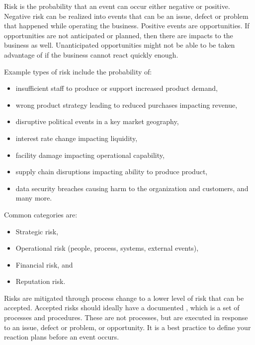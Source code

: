 %
%

Risk is the probability that an event can occur either negative or positive.
Negative risk can be realized into events that can be an issue,
defect or problem that happened while operating the business.
Positive events are opportunities.
If opportunities are not anticipated or planned, then there are impacts to the business as well.
Unanticipated opportunities might not be able to be taken advantage of if the business cannot react quickly enough.

Example types of risk include the probability of:
\begin{itemize}
    \item insufficient staff to produce or support increased product demand,
    \item wrong product strategy leading to reduced purchases impacting revenue,
    \item disruptive political events in a key market geography,
    \item interest rate change impacting liquidity,
    \item facility damage impacting operational capability,
    \item supply chain disruptions impacting ability to produce product,
    \item data security breaches causing harm to the organization and customers, and many more.
\end{itemize}

Common categories are:
\begin{itemize}
    \item Strategic risk,
    \item Operational risk (people, process, systems, external events),
    \item Financial risk, and
    \item Reputation risk.
\end{itemize}

Risks are mitigated through process change to a lower level of risk that can be accepted.
Accepted risks should ideally have a documented , which is a set of processes and procedures.
These are not  processes, but are executed in response to an issue, defect or problem, or opportunity.
It is a best practice to define your reaction plans before an event occurs.


